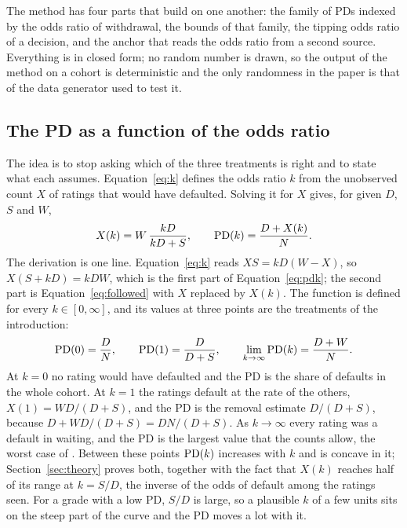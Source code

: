 The method has four parts that build on one another: the family of PDs indexed by the odds ratio of withdrawal, the bounds of that family, the tipping odds ratio of a decision, and the anchor that reads the odds ratio from a second source. Everything is in closed form; no random number is drawn, so the output of the method on a cohort is deterministic and the only randomness in the paper is that of the data generator used to test it.

\subsection{The PD as a function of the odds ratio}

The idea is to stop asking which of the three treatments is right and to state what each assumes. Equation~\eqref{eq:k} defines the odds ratio $k$ from the unobserved count $X$ of \wdn{} ratings that would have defaulted. Solving it for $X$ gives, for given $D$, $S$ and $W$,
\begin{equation}
X(k)=W\,\frac{kD}{kD+S},\qquad \mathrm{PD}(k)=\frac{D+X(k)}{N}.
\label{eq:pdk}
\end{equation}
The derivation is one line. Equation~\eqref{eq:k} reads $XS=kD(W-X)$, so $X(S+kD)=kDW$, which is the first part of Equation~\eqref{eq:pdk}; the second part is Equation~\eqref{eq:followed} with $X$ replaced by $X(k)$. The function is defined for every $k\in[0,\infty]$, and its values at three points are the treatments of the introduction:
\begin{equation}
\mathrm{PD}(0)=\frac{D}{N},\qquad \mathrm{PD}(1)=\frac{D}{D+S},\qquad \lim_{k\to\infty}\mathrm{PD}(k)=\frac{D+W}{N}.
\label{eq:limits}
\end{equation}
At $k=0$ no \wdn{} rating would have defaulted and the PD is the share of defaults in the whole cohort. At $k=1$ the \wdn{} ratings default at the rate of the others, $X(1)=WD/(D+S)$, and the PD is the removal estimate $D/(D+S)$, because $D+WD/(D+S)=DN/(D+S)$. As $k\to\infty$ every \wdn{} rating was a default in waiting, and the PD is the largest value that the counts allow, the worst case of \citet{manski1989}. Between these points $\mathrm{PD}(k)$ increases with $k$ and is concave in it; Section~\ref{sec:theory} proves both, together with the fact that $X(k)$ reaches half of its range at $k=S/D$, the inverse of the odds of default among the ratings seen. For a grade with a low PD, $S/D$ is large, so a plausible $k$ of a few units sits on the steep part of the curve and the PD moves a lot with it.

